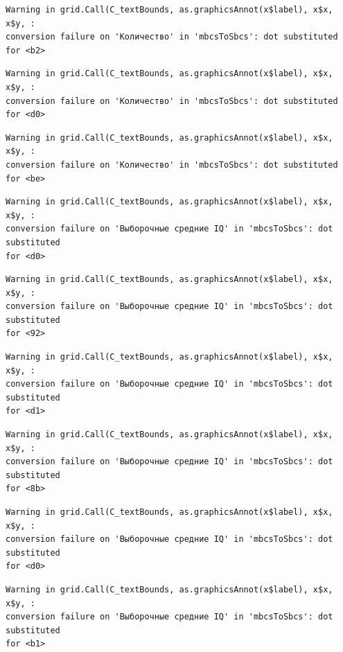 \documentclass[
  letterpaper,
  DIV=11,
  numbers=noendperiod]{scrreprt}
\theoremstyle{definition}
\theoremstyle{remark}
\begin{document}
\begin{verbatim}
Warning in grid.Call(C_textBounds, as.graphicsAnnot(x$label), x$x, x$y, :
conversion failure on 'Количество' in 'mbcsToSbcs': dot substituted for <b2>
\end{verbatim}

\begin{verbatim}
Warning in grid.Call(C_textBounds, as.graphicsAnnot(x$label), x$x, x$y, :
conversion failure on 'Количество' in 'mbcsToSbcs': dot substituted for <d0>
\end{verbatim}

\begin{verbatim}
Warning in grid.Call(C_textBounds, as.graphicsAnnot(x$label), x$x, x$y, :
conversion failure on 'Количество' in 'mbcsToSbcs': dot substituted for <be>
\end{verbatim}

\begin{verbatim}
Warning in grid.Call(C_textBounds, as.graphicsAnnot(x$label), x$x, x$y, :
conversion failure on 'Выборочные средние IQ' in 'mbcsToSbcs': dot substituted
for <d0>
\end{verbatim}

\begin{verbatim}
Warning in grid.Call(C_textBounds, as.graphicsAnnot(x$label), x$x, x$y, :
conversion failure on 'Выборочные средние IQ' in 'mbcsToSbcs': dot substituted
for <92>
\end{verbatim}

\begin{verbatim}
Warning in grid.Call(C_textBounds, as.graphicsAnnot(x$label), x$x, x$y, :
conversion failure on 'Выборочные средние IQ' in 'mbcsToSbcs': dot substituted
for <d1>
\end{verbatim}

\begin{verbatim}
Warning in grid.Call(C_textBounds, as.graphicsAnnot(x$label), x$x, x$y, :
conversion failure on 'Выборочные средние IQ' in 'mbcsToSbcs': dot substituted
for <8b>
\end{verbatim}

\begin{verbatim}
Warning in grid.Call(C_textBounds, as.graphicsAnnot(x$label), x$x, x$y, :
conversion failure on 'Выборочные средние IQ' in 'mbcsToSbcs': dot substituted
for <d0>
\end{verbatim}

\begin{verbatim}
Warning in grid.Call(C_textBounds, as.graphicsAnnot(x$label), x$x, x$y, :
conversion failure on 'Выборочные средние IQ' in 'mbcsToSbcs': dot substituted
for <b1>
\end{verbatim}
\end{document}
